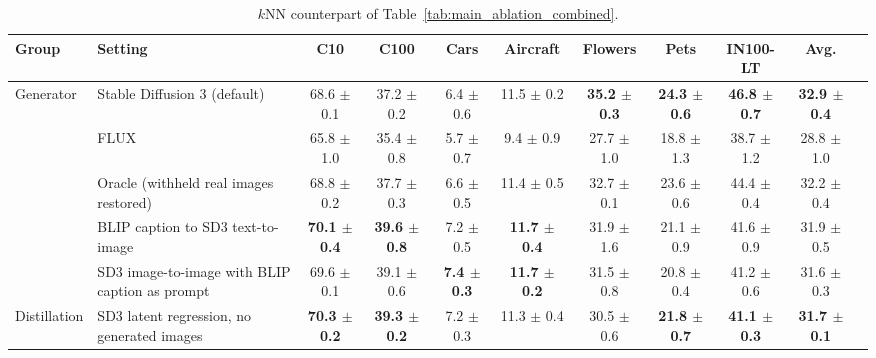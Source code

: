 \begin{table}[t]
\centering
\tiny
\setlength{\tabcolsep}{2.6pt}
\renewcommand{\arraystretch}{0.9}
\caption{$k$NN counterpart of Table~\ref{tab:main_ablation_combined}.}
\label{tab:main_ablation_combined_knn}
\begin{adjustbox}{max width=\textwidth}
\begin{tabular}{l l c c c c c c c c c}
\toprule
Group & Setting & C10 & C100 & Cars & Aircraft & Flowers & Pets & IN100-LT & Avg. \\
\midrule
Generator & Stable Diffusion 3 (default) & 68.6 {\scriptsize$\pm$ 0.1} & 37.2 {\scriptsize$\pm$ 0.2} & 6.4 {\scriptsize$\pm$ 0.6} & 11.5 {\scriptsize$\pm$ 0.2} & \textbf{35.2 {\scriptsize$\pm$ 0.3}} & \textbf{24.3 {\scriptsize$\pm$ 0.6}} & \textbf{46.8 {\scriptsize$\pm$ 0.7}} & \textbf{32.9 {\scriptsize$\pm$ 0.4}} \\
 & FLUX & 65.8 {\scriptsize$\pm$ 1.0} & 35.4 {\scriptsize$\pm$ 0.8} & 5.7 {\scriptsize$\pm$ 0.7} & 9.4 {\scriptsize$\pm$ 0.9} & 27.7 {\scriptsize$\pm$ 1.0} & 18.8 {\scriptsize$\pm$ 1.3} & 38.7 {\scriptsize$\pm$ 1.2} & 28.8 {\scriptsize$\pm$ 1.0} \\
 & Oracle (withheld real images restored) & 68.8 {\scriptsize$\pm$ 0.2} & 37.7 {\scriptsize$\pm$ 0.3} & 6.6 {\scriptsize$\pm$ 0.5} & 11.4 {\scriptsize$\pm$ 0.5} & 32.7 {\scriptsize$\pm$ 0.1} & 23.6 {\scriptsize$\pm$ 0.6} & 44.4 {\scriptsize$\pm$ 0.4} & 32.2 {\scriptsize$\pm$ 0.4} \\
 & BLIP caption to SD3 text-to-image & \textbf{70.1 {\scriptsize$\pm$ 0.4}} & \textbf{39.6 {\scriptsize$\pm$ 0.8}} & 7.2 {\scriptsize$\pm$ 0.5} & \textbf{11.7 {\scriptsize$\pm$ 0.4}} & 31.9 {\scriptsize$\pm$ 1.6} & 21.1 {\scriptsize$\pm$ 0.9} & 41.6 {\scriptsize$\pm$ 0.9} & 31.9 {\scriptsize$\pm$ 0.5} \\
 & SD3 image-to-image with BLIP caption as prompt & 69.6 {\scriptsize$\pm$ 0.1} & 39.1 {\scriptsize$\pm$ 0.6} & \textbf{7.4 {\scriptsize$\pm$ 0.3}} & \textbf{11.7 {\scriptsize$\pm$ 0.2}} & 31.5 {\scriptsize$\pm$ 0.8} & 20.8 {\scriptsize$\pm$ 0.4} & 41.2 {\scriptsize$\pm$ 0.6} & 31.6 {\scriptsize$\pm$ 0.3} \\
\midrule
Distillation & SD3 latent regression, no generated images & \textbf{70.3 {\scriptsize$\pm$ 0.2}} & \textbf{39.3 {\scriptsize$\pm$ 0.2}} & 7.2 {\scriptsize$\pm$ 0.3} & 11.3 {\scriptsize$\pm$ 0.4} & 30.5 {\scriptsize$\pm$ 0.6} & \textbf{21.8 {\scriptsize$\pm$ 0.7}} & \textbf{41.1 {\scriptsize$\pm$ 0.3}} & \textbf{31.7 {\scriptsize$\pm$ 0.1}} \\

\end{tabular}
\end{adjustbox}
\end{table}
